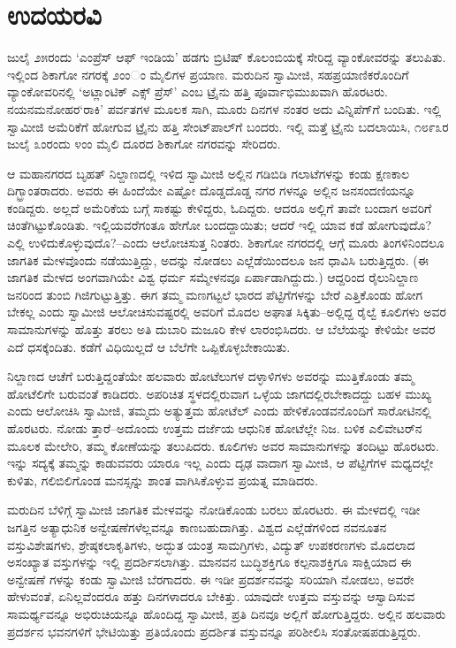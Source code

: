 
\chapter{ಉದಯರವಿ}

\noindent

ಜುಲೈ ೨೫ರಂದು ‘ಎಂಪ್ರೆಸ್ ಆಫ್ ಇಂಡಿಯ’ ಹಡಗು ಬ್ರಿಟಿಷ್ ಕೊಲಂಬಿಯಕ್ಕೆ ಸೇರಿದ್ದ ವ್ಯಾಂಕೋವರನ್ನು ತಲುಪಿತು. ಇಲ್ಲಿಂದ ಶಿಕಾಗೋ ನಗರಕ್ಕೆ ೨ಂಂಂ ಮೈಲಿಗಳ ಪ್ರಯಾಣ. ಮರುದಿನ ಸ್ವಾಮೀಜಿ, ಸಹಪ್ರಯಾಣಿಕರೊಂದಿಗೆ ವ್ಯಾಂಕೋವರಿನಲ್ಲಿ ‘ಅಟ್ಲಾಂಟಿಕ್ ಎಕ್ಸ್ ಪ್ರೆಸ್​’ ಎಂಬ ಟ್ರೈನು ಹತ್ತಿ ಪೂರ್ವಾಭಿಮುಖವಾಗಿ ಹೊರಟರು. ನಯನಮನೋಹರ‘ರಾಕಿ’ ಪರ್ವತಗಳ ಮೂಲಕ ಸಾಗಿ, ಮೂರು ದಿನಗಳ ನಂತರ ಅದು ವಿನ್ನಿಪೆಗ್​ಗೆ ಬಂದಿತು. ಇಲ್ಲಿ ಸ್ವಾಮೀಜಿ ಅಮೆರಿಕೆಗೆ ಹೋಗುವ ಟ್ರೈನು ಹತ್ತಿ ಸೇಂಟ್​ಪಾಲ್​ಗೆ ಬಂದರು. ಇಲ್ಲಿ ಮತ್ತೆ ಟ್ರೈನು ಬದಲಾಯಿಸಿ, ೧೮೯೩ರ ಜುಲೈ ೩ಂರಂದು ೪ಂಂ ಮೈಲಿ ದೂರದ ಶಿಕಾಗೋ ನಗರವನ್ನು ಸೇರಿದರು.

ಆ ಮಹಾನಗರದ ಬೃಹತ್ ನಿಲ್ದಾಣದಲ್ಲಿ ಇಳಿದ ಸ್ವಾಮೀಜಿ ಅಲ್ಲಿನ ಗಡಿಬಿಡಿ ಗಲಾಟೆಗಳನ್ನು ಕಂಡು ಕ್ಷಣಕಾಲ ದಿಗ್ಭ್ರಾಂತರಾದರು. ಅವರು ಈ ಹಿಂದೆಯೇ ಎಷ್ಟೋ ದೊಡ್ಡದೊಡ್ಡ ನಗರ ಗಳನ್ನೂ ಅಲ್ಲಿನ ಜನಸಂದಣಿಯನ್ನೂ ಕಂಡಿದ್ದರು. ಅಲ್ಲದೆ ಅಮೆರಿಕೆಯ ಬಗ್ಗೆ ಸಾಕಷ್ಟು ಕೇಳಿದ್ದರು, ಓದಿದ್ದರು. ಆದರೂ ಅಲ್ಲಿಗೆ ತಾವೇ ಬಂದಾಗ ಅವರಿಗೆ ಚಿಂತೆಗಿಟ್ಟುಕೊಂಡಿತು. ಇಲ್ಲಿಯವರೆಗಂತೂ ಹೇಗೋ ಬಂದದ್ದಾಯಿತು; ಆದರೆ ಇಲ್ಲಿ ಯಾವ ಕಡೆ ಹೋಗುವುದೊ? ಎಲ್ಲಿ ಉಳಿದುಕೊಳ್ಳುವುದೊ?–ಎಂದು ಆಲೋಚಿಸುತ್ತ ನಿಂತರು. ಶಿಕಾಗೋ ನಗರದಲ್ಲಿ ಆಗ್ಗೆ ಮೂರು ತಿಂಗಳಿನಿಂದಲೂ ಜಾಗತಿಕ ಮೇಳವೊಂದು ನಡೆಯುತ್ತಿದ್ದು, ಅದನ್ನು ನೋಡಲು ಎಲ್ಲೆಡೆಯಿಂದಲೂ ಜನ ಧಾವಿಸಿ ಬರುತ್ತಿದ್ದರು. (ಈ ಜಾಗತಿಕ ಮೇಳದ ಅಂಗವಾಗಿಯೇ ವಿಶ್ವ ಧರ್ಮ ಸಮ್ಮೇಳನವೂ ಏರ್ಪಾಡಾಗಿದ್ದುದು.) ಆದ್ದರಿಂದ ರೈಲುನಿಲ್ದಾಣ ಜನರಿಂದ ತುಂಬಿ ಗಿಜಿಗುಟ್ಟುತ್ತಿತ್ತು. ಈಗ ತಮ್ಮ ಮಣಗಟ್ಟಲೆ ಭಾರದ ಪೆಟ್ಟಿಗೆಗಳನ್ನು ಬೇರೆ ಎತ್ತಿಕೊಂಡು ಹೋಗ ಬೇಕಲ್ಲ ಎಂದು ಸ್ವಾಮೀಜಿ ಆಲೋಚಿಸುವಷ್ಟರಲ್ಲಿ ಅವರಿಗೆ ಮೊದಲ ಅಘಾತ ಸಿಕ್ಕಿತು–ಅಲ್ಲಿದ್ದ ರೈಲ್ವೆ ಕೂಲಿಗಳು ಅವರ ಸಾಮಾನುಗಳನ್ನು ಹೊತ್ತು ತರಲು ಅತಿ ದುಬಾರಿ ಮಜೂರಿ ಕೇಳ ಲಾರಂಭಿಸಿದರು. ಆ ಬೆಲೆಯನ್ನು ಕೇಳಿಯೇ ಅವರ ಎದೆ ಧಸಕ್ಕೆಂದಿತು. ಕಡೆಗೆ ವಿಧಿಯಿಲ್ಲದೆ ಆ ಬೆಲೆಗೇ ಒಪ್ಪಿಕೊಳ್ಳಬೇಕಾಯಿತು.

ನಿಲ್ದಾಣದ ಆಚೆಗೆ ಬರುತ್ತಿದ್ದಂತೆಯೇ ಹಲವಾರು ಹೋಟೆಲುಗಳ ದಳ್ಳಾಳಿಗಳು ಅವರನ್ನು ಮುತ್ತಿಕೊಂಡು ತಮ್ಮ ಹೋಟೆಲಿಗೇ ಬರುವಂತೆ ಕಾಡಿದರು. ಅಪರಿಚಿತ ಸ್ಥಳದಲ್ಲಿರುವಾಗ ಒಳ್ಳೆಯ ಜಾಗದಲ್ಲಿರಬೇಕಾದದ್ದು ಬಹಳ ಮುಖ್ಯ ಎಂದು ಆಲೋಚಿಸಿ ಸ್ವಾಮೀಜಿ, ತಮ್ಮದು ಅತ್ಯುತ್ತಮ ಹೋಟೆಲ್ ಎಂದು ಹೇಳಿಕೊಂಡವನೊಂದಿಗೆ ಸಾರೋಟಿನಲ್ಲಿ ಹೊರಟರು. ನೋಡು ತ್ತಾರೆ–ಅದೊಂದು ಉತ್ತಮ ದರ್ಜೆಯ ಆಧುನಿಕ ಹೋಟೆಲ್ಲೇ ನಿಜ. ಬಳಿಕ ಎಲಿವೇಟರ್​ನ ಮೂಲಕ ಮೇಲೇರಿ, ತಮ್ಮ ಕೋಣೆಯನ್ನು ತಲುಪಿದರು. ಕೂಲಿಗಳು ಅವರ ಸಾಮಾನುಗಳನ್ನು ತಂದಿಟ್ಟು ಹೊರಟರು. ಇನ್ನು ಸದ್ಯಕ್ಕೆ ತಮ್ಮನ್ನು ಕಾಡುವವರು ಯಾರೂ ಇಲ್ಲ ಎಂದು ದೃಢ ವಾದಾಗ ಸ್ವಾಮೀಜಿ, ಆ ಪೆಟ್ಟಿಗೆಗಳ ಮಧ್ಯದಲ್ಲೇ ಕುಳಿತು, ಗಲಿಬಿಲಿಗೊಂಡ ಮನಸ್ಸನ್ನು ಶಾಂತ ವಾಗಿಸಿಕೊಳ್ಳುವ ಪ್ರಯತ್ನ ಮಾಡಿದರು.

ಮರುದಿನ ಬೆಳಿಗ್ಗೆ ಸ್ವಾಮೀಜಿ ಜಾಗತಿಕ ಮೇಳವನ್ನು ನೋಡಿಕೊಂಡು ಬರಲು ಹೊರಟರು. ಈ ಮೇಳದಲ್ಲಿ ಇಡೀ ಜಗತ್ತಿನ ಅತ್ಯಾಧುನಿಕ ಅನ್ವೇಷಣೆಗಳೆಲ್ಲವನ್ನೂ ಕಾಣಬಹುದಾಗಿತ್ತು. ವಿಶ್ವದ ಎಲ್ಲೆಡೆಗಳಿಂದ ನವನೂತನ ವಸ್ತುವಿಶೇಷಗಳು, ಶ್ರೇಷ್ಠಕಲಾಕೃತಿಗಳು, ಅದ್ಭುತ ಯಂತ್ರ ಸಾಮಗ್ರಿಗಳು, ವಿದ್ಯುತ್ ಉಪಕರಣಗಳು ಮೊದಲಾದ ಅಸಂಖ್ಯಾತ ವಸ್ತುಗಳನ್ನು ಇಲ್ಲಿ ಪ್ರದರ್ಶಿಸಲಾಗಿತ್ತು. ಮಾನವನ ಬುದ್ಧಿಶಕ್ತಿಗೂ ಕಲ್ಪನಾಶಕ್ತಿಗೂ ಸಾಕ್ಷಿಯಾದ ಈ ಅನ್ವೇಷಣೆ ಗಳನ್ನು ಕಂಡು ಸ್ವಾಮೀಜಿ ಬೆರಗಾದರು. ಈ ಇಡೀ ಪ್ರದರ್ಶನವನ್ನು ಸರಿಯಾಗಿ ನೋಡಲು, ಅವರೇ ಹೇಳುವಂತೆ, ಏನಿಲ್ಲವೆಂದರೂ ಹತ್ತು ದಿನಗಳಾದರೂ ಬೇಕಿತ್ತು. ಯಾವುದೇ ಉತ್ತಮ ವಸ್ತುವನ್ನು ಆಸ್ವಾದಿಸುವ ಸಾಮರ್ಥ್ಯವನ್ನೂ ಅಭಿರುಚಿಯನ್ನೂ ಹೊಂದಿದ್ದ ಸ್ವಾಮೀಜಿ, ಪ್ರತಿ ದಿನವೂ ಅಲ್ಲಿಗೆ ಹೋಗುತ್ತಿದ್ದರು. ಅಲ್ಲಿನ ಹಲವಾರು ಪ್ರದರ್ಶನ ಭವನಗಳಿಗೆ ಭೇಟಿಯಿತ್ತು ಪ್ರತಿಯೊಂದು ಪ್ರದರ್ಶಿತ ವಸ್ತುವನ್ನೂ ಪರಿಶೀಲಿಸಿ ಸಂತೋಷಪಡುತ್ತಿದ್ದರು.

